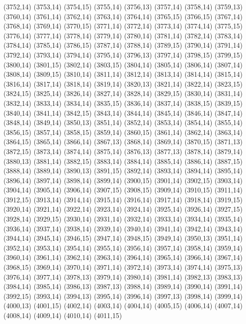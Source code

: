 (3752,14)
(3753,14)
(3754,15)
(3755,14)
(3756,13)
(3757,14)
(3758,14)
(3759,13)
(3760,14)
(3761,14)
(3762,14)
(3763,14)
(3764,14)
(3765,15)
(3766,15)
(3767,14)
(3768,14)
(3769,14)
(3770,15)
(3771,14)
(3772,14)
(3773,14)
(3774,14)
(3775,15)
(3776,14)
(3777,14)
(3778,14)
(3779,14)
(3780,14)
(3781,14)
(3782,14)
(3783,14)
(3784,14)
(3785,14)
(3786,15)
(3787,14)
(3788,14)
(3789,15)
(3790,14)
(3791,14)
(3792,14)
(3793,14)
(3794,14)
(3795,14)
(3796,13)
(3797,14)
(3798,15)
(3799,15)
(3800,14)
(3801,15)
(3802,14)
(3803,15)
(3804,14)
(3805,14)
(3806,14)
(3807,14)
(3808,14)
(3809,15)
(3810,14)
(3811,14)
(3812,14)
(3813,14)
(3814,14)
(3815,14)
(3816,14)
(3817,14)
(3818,14)
(3819,14)
(3820,13)
(3821,14)
(3822,14)
(3823,15)
(3824,15)
(3825,14)
(3826,14)
(3827,14)
(3828,14)
(3829,15)
(3830,14)
(3831,14)
(3832,14)
(3833,14)
(3834,14)
(3835,15)
(3836,14)
(3837,14)
(3838,15)
(3839,15)
(3840,14)
(3841,14)
(3842,15)
(3843,14)
(3844,14)
(3845,14)
(3846,14)
(3847,14)
(3848,14)
(3849,14)
(3850,13)
(3851,14)
(3852,14)
(3853,14)
(3854,14)
(3855,14)
(3856,15)
(3857,14)
(3858,15)
(3859,14)
(3860,15)
(3861,14)
(3862,14)
(3863,14)
(3864,15)
(3865,14)
(3866,14)
(3867,13)
(3868,14)
(3869,14)
(3870,15)
(3871,13)
(3872,15)
(3873,14)
(3874,14)
(3875,14)
(3876,13)
(3877,13)
(3878,14)
(3879,14)
(3880,13)
(3881,14)
(3882,15)
(3883,14)
(3884,14)
(3885,14)
(3886,14)
(3887,15)
(3888,14)
(3889,14)
(3890,13)
(3891,15)
(3892,14)
(3893,14)
(3894,14)
(3895,14)
(3896,14)
(3897,14)
(3898,14)
(3899,14)
(3900,15)
(3901,14)
(3902,15)
(3903,14)
(3904,14)
(3905,14)
(3906,14)
(3907,15)
(3908,15)
(3909,14)
(3910,15)
(3911,14)
(3912,15)
(3913,14)
(3914,14)
(3915,14)
(3916,14)
(3917,14)
(3918,14)
(3919,15)
(3920,14)
(3921,14)
(3922,14)
(3923,14)
(3924,14)
(3925,14)
(3926,14)
(3927,15)
(3928,14)
(3929,15)
(3930,14)
(3931,14)
(3932,14)
(3933,14)
(3934,14)
(3935,14)
(3936,14)
(3937,14)
(3938,14)
(3939,14)
(3940,14)
(3941,14)
(3942,14)
(3943,14)
(3944,14)
(3945,14)
(3946,15)
(3947,14)
(3948,15)
(3949,14)
(3950,13)
(3951,14)
(3952,14)
(3953,14)
(3954,14)
(3955,14)
(3956,14)
(3957,14)
(3958,14)
(3959,14)
(3960,14)
(3961,14)
(3962,14)
(3963,14)
(3964,14)
(3965,14)
(3966,14)
(3967,14)
(3968,15)
(3969,14)
(3970,14)
(3971,14)
(3972,14)
(3973,14)
(3974,14)
(3975,13)
(3976,14)
(3977,14)
(3978,13)
(3979,14)
(3980,14)
(3981,14)
(3982,13)
(3983,13)
(3984,14)
(3985,14)
(3986,13)
(3987,13)
(3988,14)
(3989,14)
(3990,14)
(3991,14)
(3992,15)
(3993,14)
(3994,13)
(3995,14)
(3996,14)
(3997,13)
(3998,14)
(3999,14)
(4000,13)
(4001,15)
(4002,14)
(4003,14)
(4004,14)
(4005,15)
(4006,14)
(4007,14)
(4008,14)
(4009,14)
(4010,14)
(4011,15)
